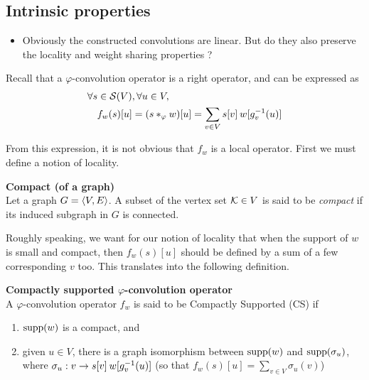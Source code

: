 \subsection{Intrinsic properties}

\begin{itemize}
  \item Obviously the constructed convolutions are linear. But do they also preserve the locality and weight sharing properties ?
\end{itemize}

Recall that a $\varphi$-convolution operator is a right operator, and can be expressed as
\begin{align}
\forall s \in \cs(V) &, \forall u \in V,\nonumber\\
f_w(s)[u] & = (s \ast_{\varphi} w) [u]\nonumber
            = \displaystyle\sum_{v \in V} s[v] \h{2} w[g_v^{-1}(u)] \label{eq:sum}
\end{align}

From this expression, it is not obvious that $f_w$ is a local operator. First we must define a notion of locality.

\begin{definition}\textbf{Compact (of a graph)}\\
Let a graph $\gve$. A subset of the vertex set $\ck \in V$ is said to be \emph{compact} if its induced subgraph in $G$ is connected.
\end{definition}

Roughly speaking, we want for our notion of locality that when the support of $w$ is small and compact, then $f_w(s)[u]$ should be defined by a sum of a few corresponding $v$ too. This translates into the following definition.

\begin{definition}\textbf{Compactly supported $\varphi$-convolution operator}\\
A $\varphi$-convolution operator $f_w$ is said to be Compactly Supported (CS) if
\begin{enumerate}
  \item $\supp(w)$ is a compact, and
  \item given $u \in V$, there is a graph isomorphism between $\supp(w)$ and $\supp(\sigma_u)$, where $\sigma_u: v \to s[v] \h{2} w[g_v^{-1}(u)]$ (so that $f_w(s)[u] = \sum_{v \in V} \sigma_u(v)$)
\end{enumerate}
\end{definition}

